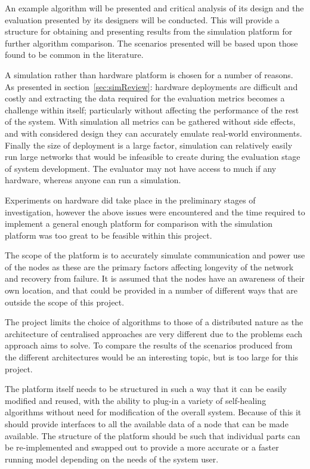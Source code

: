 \documentclass[authoryearcitations]{UoYCSproject}
\begin{document}
An example algorithm will be presented and critical analysis of its design and the evaluation presented by its designers will be conducted. This will provide a structure for obtaining and presenting results from the simulation platform for further algorithm comparison. The scenarios presented will be based upon those found to be common in the literature.

A simulation rather than hardware platform is chosen for a number of reasons. As presented in section~\ref{sec:simReview}: hardware deployments are difficult and costly and extracting the data required for the evaluation metrics becomes a challenge within itself; particularly without affecting the performance of the rest of the system. With simulation all metrics can be gathered without side effects, and with considered design they can accurately emulate real-world environments. Finally the size of deployment is a large factor, simulation can relatively easily run large networks that would be infeasible to create during the evaluation stage of system development. The evaluator may not have access to much if any hardware, whereas anyone can run a simulation.

Experiments on hardware did take place in the preliminary stages of investigation, however the above issues were encountered and the time required to implement a general enough platform for comparison with the simulation platform was too great to be feasible within this project.

The scope of the platform is to accurately simulate communication and power use of the nodes as these are the primary factors affecting longevity of the network and recovery from failure. It is assumed that the nodes have an awareness of their own location, and that could be provided in a number of different ways that are outside the scope of this project.

The project limits the choice of algorithms to those of a distributed nature as the architecture of centralised approaches are very different due to the problems each approach aims to solve. To compare the results of the scenarios produced from the different architectures would be an interesting topic, but is too large for this project.

The platform itself needs to be structured in such a way that it can be easily modified and reused, with the ability to plug-in a variety of self-healing algorithms without need for modification of the overall system. Because of this it should provide interfaces to all the available data of a node that can be made available. The structure of the platform should be such that individual parts can be re-implemented and swapped out to provide a more accurate or a faster running model depending on the needs of the system user.
\end{document}
